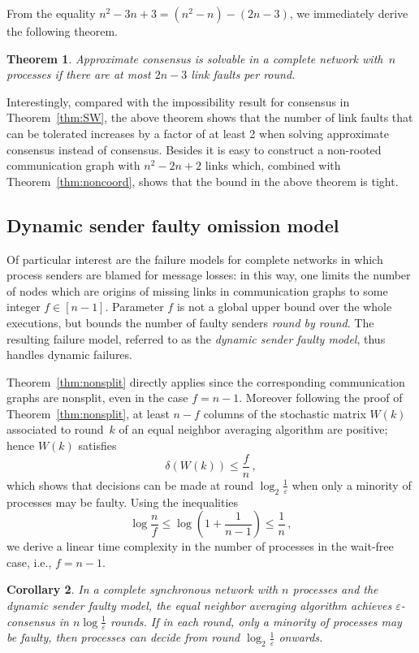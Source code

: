 \documentclass[a4paper]{article}
\theoremstyle{newthm}
\newtheorem{thm}{Theorem}
\newtheorem{cor}[thm]{Corollary}
\renewcommand{\leq}{\leqslant}
\begin{document}
From the equality $n^2 - 3n + 3 = (n^2 - n) - (2n -  3)$, we immediately derive the following theorem.

\begin{thm}\label{thm:2n-2}
Approximate consensus is solvable in a complete network with~$n$ processes if
	there are at most $2n-3$ link faults per  round.
\end{thm}

Interestingly, compared with the impossibility result  for consensus  in Theorem~\ref{thm:SW},  
	the above theorem shows that the number of link faults that can be tolerated increases by a factor of at least 2 
	when solving  approximate consensus instead of consensus.
Besides  it is easy to construct a non-rooted communication graph with  $n^2- 2n  + 2$ links which,
	combined with Theorem~\ref{thm:noncoord},  shows that the bound in the above theorem is tight.

\subsection{Dynamic sender faulty omission model}

Of particular interest are the failure models for complete networks in which process senders are blamed for message
	losses: in this way, one limits  the number of nodes which are origins of
	missing links in  communication graphs to some integer  $f \in [ n-1 ] $.
Parameter $f$ is not a global upper bound over the whole executions, but bounds the number of faulty senders 
	{\em round by round}.
The resulting failure model, referred to as the {\em dynamic sender faulty model}, thus handles dynamic
	failures. 
	
Theorem~\ref{thm:nonsplit} directly applies since the corresponding communication graphs are nonsplit, 
	even in the case $f=n-1$.
Moreover  following the proof of Theorem~\ref{thm:nonsplit}, at least $n-f$ columns of the stochastic matrix $W(k)$
	associated to round~$k$ of an equal neighbor averaging algorithm are positive; hence $W(k)$ satisfies
	$$ \delta(W(k)) \leq  \frac{f}{n} \, ,$$
	which shows that decisions can be made at round $\log_2  \frac{1}{\varepsilon} $ when only a minority
	of processes may be faulty.
Using the inequalities
	$$ \log \frac{n}{f}  \leq \log \left ( 1 + \frac{1}{n-1} \right ) \leq \frac{1}{n} \, ,$$
	we derive a linear time complexity in the number of processes in the wait-free case, i.e., $f=n-1$.

\begin{cor}\label{cor:clean}
In a complete synchronous network with $n$ processes and the dynamic sender faulty  model, 
	the equal neighbor averaging algorithm achieves $\varepsilon$-consensus in
	$ n \log \frac{1}{\varepsilon} $ rounds.
If in each round, only a minority of processes may be faulty, then processes can decide from  round
	$\log_2  \frac{1}{\varepsilon} $ onwards. 
\end{cor}
	
\end{document}
